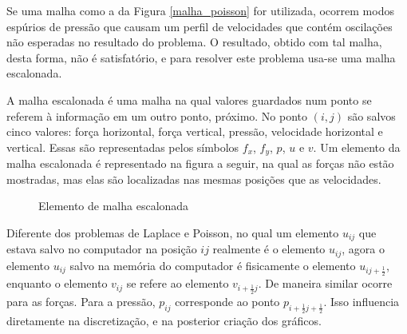 \documentclass[journal]{IEEEtran}
\begin{document}
Se uma malha como a da Figura \ref{malha_poisson} for utilizada, ocorrem modos espúrios de pressão que causam um perfil de velocidades que contém oscilações não esperadas no resultado do problema\cite{notas_de_aula_john}. O resultado, obtido com tal malha, desta forma, não é satisfatório, e para resolver este problema usa-se uma malha escalonada\cite{notas_de_aula_john}.

A malha escalonada é uma malha na qual valores guardados num ponto se referem à informação em um outro ponto, próximo. No ponto $(i,j)$ são salvos cinco valores: força horizontal, força vertical, pressão, velocidade horizontal e vertical. Essas são representadas pelos símbolos $f_x$, $f_y$, $p$, $u$ e $v$. Um elemento da malha escalonada é representado na figura a seguir, na qual as forças não estão mostradas, mas elas são localizadas nas mesmas posições que as velocidades.

\begin{figure}[!ht]
\centering
{}
\caption{Elemento de malha escalonada}
\end{figure}

Diferente dos problemas de Laplace e Poisson, no qual um elemento $u_{ij}$ que estava salvo no computador na posição $ij$ realmente é o elemento $u_{ij}$, agora o elemento $u_{ij}$ salvo na memória do computador é fisicamente o elemento $u_{ij+\frac{1}{2}}$, enquanto o elemento $v_{ij}$ se refere ao elemento $v_{i+\frac{1}{2}j}$. De maneira similar ocorre para as forças. Para a pressão, $p_{ij}$ corresponde ao ponto $p_{i+\frac{1}{2}j+\frac{1}{2}}$. Isso influencia diretamente na discretização, e na posterior criação dos gráficos.
\end{document}
